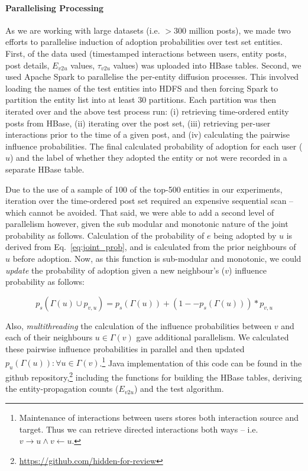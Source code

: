 \documentclass[sigconf]{acmart}
\begin{document}
\paragraph{Parallelising Processing}
As we are working with large datasets (i.e. $>300$ million posts), we made two efforts to parallelise induction of adoption probabilities over test set entities.
First, of the data used (timestamped interactions between users, entity posts, post details, $E_{v2u}$ values, $\tau_{v2u}$ values) was uploaded into HBase tables. %
Second, we used Apache Spark%
 to parallelise the per-entity diffusion processes.
This involved loading the names of the test entities into HDFS and then forcing Spark to partition the entity list into at least 30 partitions.
Each partition was then iterated over and the above test process run: (i) retrieving time-ordered entity posts from HBase, (ii) iterating over the post set, (iii) retrieving per-user interactions prior to the time of a given post, and (iv) calculating the pairwise influence probabilities.
The final calculated probability of adoption for each user ($u$) and the label of whether they adopted the entity or not were recorded in a separate HBase table.

Due to the use of a sample of 100 of the top-500 entities in our experiments, iteration over the time-ordered post set required an expensive sequential scan -- which cannot be avoided.
That said, we were able to add a second level of parallelism however, given the sub modular and monotonic nature of the joint probability as follows.
Calculation of the probability of $e$ being adopted by $u$ is derived from Eq.~\ref{eq:joint_prob}, and is calculated from the prior neighbours of $u$ before adoption.
Now, as this function is sub-modular and monotonic, we could \emph{update} the probability of adoption given a new neighbour's ($v$) influence probability as follows:

\begin{equation}
p_s(\Gamma(u) \cup p_{v,u}) = p_s(\Gamma(u)) + (1 -- p_s(\Gamma(u))) * p_{v,u}
\end{equation}

Also, \emph{multithreading} the calculation of the influence probabilities between $v$ and each of their neighbours $u \in \Gamma(v)$ gave additional parallelism. We calculated these pairwise influence probabilities in parallel and then updated $p_u(\Gamma(u)) : \forall u \in \Gamma(v)$.\footnote{Maintenance of interactions between users stores both interaction source and target. Thus we can retrieve directed interactions both ways -- i.e. $v \rightarrow u \wedge v \leftarrow u$.}
Java implementation of this code can be found in the github repository,\footnote{\url{https://github.com/hidden-for-review}} including the functions for building the HBase tables, deriving the entity-propagation counts ($E_{v2u}$) and the test algorithm.
\end{document}

